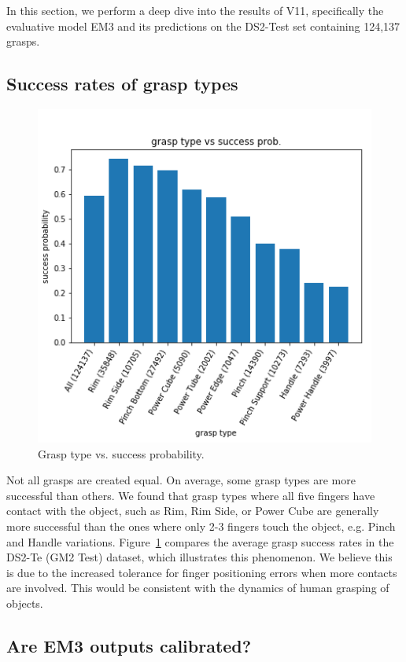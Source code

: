 
\noindent
In this section, we perform a deep dive into the results of V11, specifically the evaluative model EM3 and its predictions on the DS2-Test set containing 124,137 grasps. 

\subsection{Success rates of grasp types}
\noindent

\begin{figure}
\centering 
\includegraphics[width=0.6\columnwidth]{images/post-analysis/Grasp_type_vs_success_prob.png}
\caption{Grasp type vs. success probability.}
\label{fig:post2}
\end{figure}

Not all grasps are created equal. On average, some grasp types are more successful than others. We found that grasp types where all five fingers have contact with the object, such as Rim, Rim Side, or Power Cube are generally more successful than the ones where only 2-3 fingers touch the object, e.g. Pinch and Handle variations. Figure~\ref{fig:post2} compares the average grasp success rates in the DS2-Te (GM2 Test) dataset, which illustrates this phenomenon. We believe this is due to the increased tolerance for finger positioning errors when more contacts are involved. This would be consistent with the dynamics of human grasping of objects. 

\subsection{Are EM3 outputs calibrated?}
\noindent

